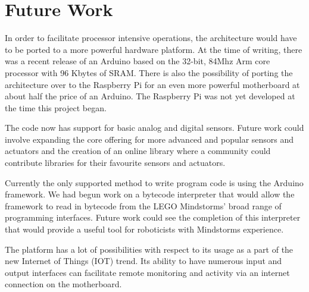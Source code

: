 \section{Future Work}
In order to facilitate processor intensive operations, the architecture would have to be ported to a more powerful hardware platform. At the time of writing, there was a recent release of an Arduino based on the 32-bit, 84Mhz Arm core processor with 96 Kbytes of SRAM. There is also the possibility of porting the architecture over to the Raspberry Pi for an even more powerful motherboard at about half the price of an Arduino. The Raspberry Pi was not yet developed at the time this project began.

The code now has support for basic analog and digital sensors. Future work could involve expanding the core offering for more advanced and popular sensors and actuators and the creation of an online library where a community could contribute libraries for their favourite sensors and actuators.

Currently the only supported method to write program code is using the Arduino framework. We had begun work on a bytecode interpreter that would allow the \xten framework to read in bytecode from the LEGO Mindstorms' broad range of programming interfaces. Future work could see the completion of this interpreter that would provide a useful tool for roboticists with Mindstorms experience.

The \xten platform has a lot of possibilities with respect to its usage as a part of the new Internet of Things (IOT) trend. Its ability to have numerous input and output interfaces can facilitate remote monitoring and activity via an internet connection on the motherboard.